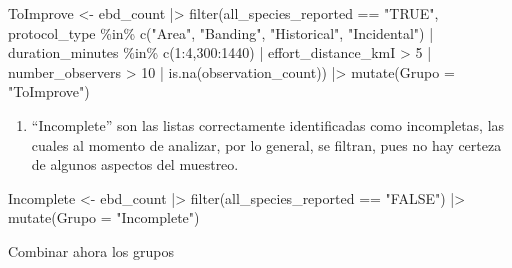 \documentclass[
]{article}
\newenvironment{Shaded}{\begin{snugshade}}{\end{snugshade}}
\newcommand{\AttributeTok}[1]{\textcolor[rgb]{0.77,0.63,0.00}{#1}}
\newcommand{\DecValTok}[1]{\textcolor[rgb]{0.00,0.00,0.81}{#1}}
\newcommand{\FunctionTok}[1]{\textcolor[rgb]{0.00,0.00,0.00}{#1}}
\newcommand{\NormalTok}[1]{#1}
\newcommand{\OtherTok}[1]{\textcolor[rgb]{0.56,0.35,0.01}{#1}}
\newcommand{\SpecialCharTok}[1]{\textcolor[rgb]{0.00,0.00,0.00}{#1}}
\newcommand{\StringTok}[1]{\textcolor[rgb]{0.31,0.60,0.02}{#1}}
\providecommand{\tightlist}{%
  \setlength{\itemsep}{0pt}\setlength{\parskip}{0pt}}
\begin{document}
\begin{Shaded}
\begin{Highlighting}[]
\NormalTok{ToImprove }\OtherTok{\textless{}{-}}\NormalTok{ ebd\_count }\SpecialCharTok{|\textgreater{}}
  \FunctionTok{filter}\NormalTok{(all\_species\_reported }\SpecialCharTok{==} \StringTok{"TRUE"}\NormalTok{,}
\NormalTok{         protocol\_type }\SpecialCharTok{\%in\%} \FunctionTok{c}\NormalTok{(}\StringTok{"Area"}\NormalTok{,}
                              \StringTok{"Banding"}\NormalTok{,}
                              \StringTok{"Historical"}\NormalTok{,}
                              \StringTok{"Incidental"}\NormalTok{) }\SpecialCharTok{|}
\NormalTok{         duration\_minutes }\SpecialCharTok{\%in\%} \FunctionTok{c}\NormalTok{(}\DecValTok{1}\SpecialCharTok{:}\DecValTok{4}\NormalTok{,}\DecValTok{300}\SpecialCharTok{:}\DecValTok{1440}\NormalTok{) }\SpecialCharTok{|} 
\NormalTok{         effort\_distance\_kmI }\SpecialCharTok{\textgreater{}} \DecValTok{5} \SpecialCharTok{|}
\NormalTok{         number\_observers }\SpecialCharTok{\textgreater{}} \DecValTok{10} \SpecialCharTok{|}
         \FunctionTok{is.na}\NormalTok{(observation\_count)) }\SpecialCharTok{|\textgreater{}}
  \FunctionTok{mutate}\NormalTok{(}\AttributeTok{Grupo =} \StringTok{"ToImprove"}\NormalTok{)}
\end{Highlighting}
\end{Shaded}

\begin{enumerate}
\def\labelenumi{\arabic{enumi}.}
\setcounter{enumi}{4}
\tightlist
\item
  ``Incomplete'' son las listas correctamente identificadas como
  incompletas, las cuales al momento de analizar, por lo general, se
  filtran, pues no hay certeza de algunos aspectos del muestreo.
\end{enumerate}

\begin{Shaded}
\begin{Highlighting}[]
\NormalTok{Incomplete }\OtherTok{\textless{}{-}}\NormalTok{ ebd\_count }\SpecialCharTok{|\textgreater{}}
  \FunctionTok{filter}\NormalTok{(all\_species\_reported }\SpecialCharTok{==} \StringTok{"FALSE"}\NormalTok{) }\SpecialCharTok{|\textgreater{}}
  \FunctionTok{mutate}\NormalTok{(}\AttributeTok{Grupo =} \StringTok{"Incomplete"}\NormalTok{)}
\end{Highlighting}
\end{Shaded}

Combinar ahora los grupos
\end{document}
